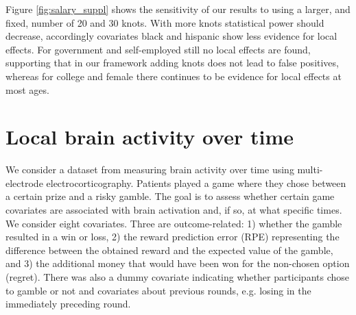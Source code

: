 
 
Figure \ref{fig:salary_suppl} shows the sensitivity of our results to using a larger, and fixed, number of 20 and 30 knots.
With more knots statistical power should decrease, accordingly covariates black and hispanic show less evidence for local effects. 
For government and self-employed still no local effects are found, supporting that in our framework adding knots does not lead to false positives, whereas for college and female there continues to be evidence for local effects at most ages.



\section{Local brain activity over time}
\label{ssec:saez_data}


We consider a dataset from  \cite{saez:2018} measuring brain activity over time using multi-electrode electrocorticography.  
Patients played a game where they chose between a certain prize and a risky gamble. %
The goal is to assess whether certain game covariates are associated with brain activation and, if so, at what specific times. 
We consider eight covariates. Three are outcome-related: 1) whether the gamble resulted in a win or loss, 2) the reward prediction error (RPE) representing the difference between the obtained reward and the expected value of the gamble, and 3) the additional money that would have been won for the non-chosen option (regret). There was also a dummy covariate indicating whether participants chose to gamble or not and covariates about previous rounds, e.g. losing in the immediately preceding round.

